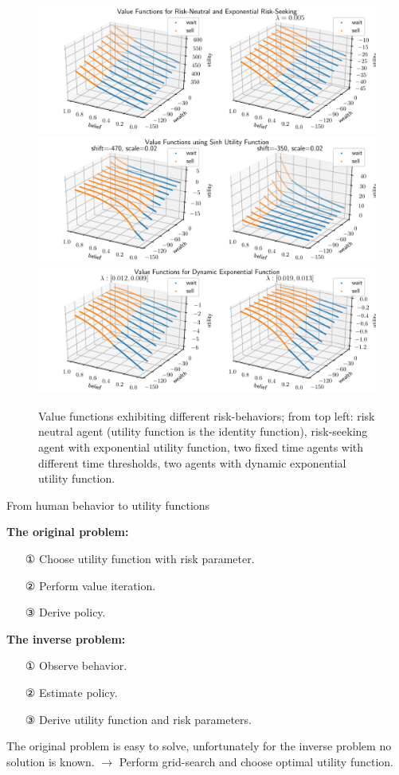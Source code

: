 \begin{figure}
    \includegraphics[width=0.9\linewidth]{img/exp_policy.pdf}\\
    \vspace{0.5cm}
    \includegraphics[width=0.9\linewidth]{img/sinh_policy.pdf}\\
    \vspace{0.5cm}
    \includegraphics[width=0.9\linewidth]{img/dyn_policy.pdf}
    \caption{Value functions exhibiting different risk-behaviors; from top left: risk neutral agent (utility function is the identity function), risk-seeking agent with exponential utility function, two fixed time agents with different time thresholds, two agents with dynamic exponential utility function.}
\end{figure}

\large{From human behavior to utility functions}


\normalsize
\textbf{The original problem:}
\begin{itemize}
\item[①] Choose utility function with risk parameter.
\item[②] Perform value iteration.
\item[③] Derive policy.
\end{itemize}

\textbf{The inverse problem:}
\begin{itemize}
\item[①] Observe behavior.
\item[②] Estimate policy.
\item[③] Derive utility function and risk parameters.
\end{itemize}

The original problem is easy to solve, unfortunately for the inverse problem no solution is known. $\rightarrow$ Perform grid-search and choose optimal utility function.
